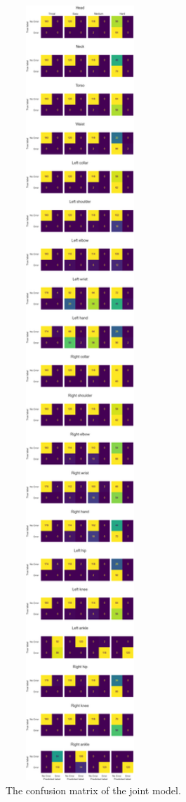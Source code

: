 \begin{figure}
  \centering
  \includegraphics[width=0.5\textwidth]{figures/results/confusion/joints.png}
  \caption[Joint model confusion matrix]{The confusion matrix of the joint model.}
  \label{fig:joint_confusion_matrix}
\end{figure}